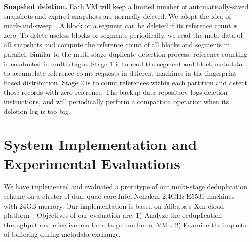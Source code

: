 {\bf Snapshot deletion.} Each VM will keep a limited number of  automatically-saved snapshots and
expired snapshots are normally deleted.
We adopt the idea of mark-and-sweep~\cite{Guo2011}.
A block or a segment can be deleted if its reference count is zero.
To delete useless  blocks or segments periodically, we read the meta data  of all
snapshots and compute the reference count of all blocks and segments  in parallel.
Similar to the multi-stage duplicate detection process, reference counting is conducted in multi-stages.
Stage  1 is to read  the segment and block  metadata
to accumulate  reference count requests in different machines  in the fingerprint based distribution.
Stage   2 is to count references within each partition and detect those records with zero
reference.
The backup  data repository logs deletion instructions,  and will periodically perform a compaction operation when
its deletion log is too big.


\section{System Implementation and Experimental Evaluations}
\label{offline:eval}
We have implemented and evaluated a prototype of our multi-stage deduplication scheme on a cluster
of dual quad-core Intel Nehalem 2.4GHz E5530 machines with 24GB memory.
Our implementation is based on Alibaba's Xen cloud platform~\cite{Aliyun,WeiZhangIEEE}.
Objectives of our evaluation are:
1) Analyze the deduplication throughput and effectiveness for a large number of VMs.
2) Examine the impacts of buffering during metadata exchange.


